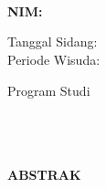 %
%
%
%

\chapter*{\MakeUppercase{\judul}}

\fontsize{14}{16.8}
\begin{center}
	\vspace{0.3cm}
	\MakeUppercase{\textbf{\penulis}}\\
	\MakeUppercase{\textbf{NIM: \nim}}\\
	\fontsize{12}{14.4}
	\vspace{0.7cm}

	Tanggal Sidang: \tanggalSidang\\
	Periode Wisuda:\ \ \ \ \ \ \ \ \ \ \ \ \ \ \ \ \ \ \ \ \ \ \ \ \ \ \ \ \ \ \ \ \ \ \ \ \ \

	\vspace{0.7cm}
	Program Studi \programStudi\\
	\fakultas\\
	\universitas\\
	\alamatUniversitas\\

	\vspace{0.7cm}
\end{center}

\fontsize{12}{14.4}
\begin{center}\MakeUppercase{\textbf{Abstrak}}\end{center}

